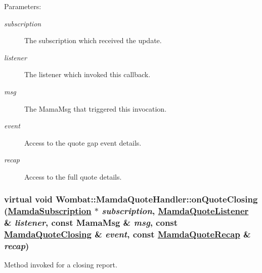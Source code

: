 \begin{Desc}
\item[Parameters:]
\begin{description}
\item[{\em subscription}]The subscription which received the update. \item[{\em listener}]The listener which invoked this callback. \item[{\em msg}]The Mama\-Msg that triggered this invocation. \item[{\em event}]Access to the quote gap event details. \item[{\em recap}]Access to the full quote details. \end{description}
\end{Desc}
\hypertarget{classWombat_1_1MamdaQuoteHandler_6f073c562e2a7c4c5acace68e1eadd83}{
\subsubsection[onQuoteClosing]{\setlength{\rightskip}{0pt plus 5cm}virtual void Wombat::Mamda\-Quote\-Handler::on\-Quote\-Closing (\hyperlink{classWombat_1_1MamdaSubscription}{Mamda\-Subscription} $\ast$ {\em subscription}, \hyperlink{classWombat_1_1MamdaQuoteListener}{Mamda\-Quote\-Listener} \& {\em listener}, const Mama\-Msg \& {\em msg}, const \hyperlink{classWombat_1_1MamdaQuoteClosing}{Mamda\-Quote\-Closing} \& {\em event}, const \hyperlink{classWombat_1_1MamdaQuoteRecap}{Mamda\-Quote\-Recap} \& {\em recap})}}
\label{classWombat_1_1MamdaQuoteHandler_6f073c562e2a7c4c5acace68e1eadd83}


Method invoked for a closing report. 

